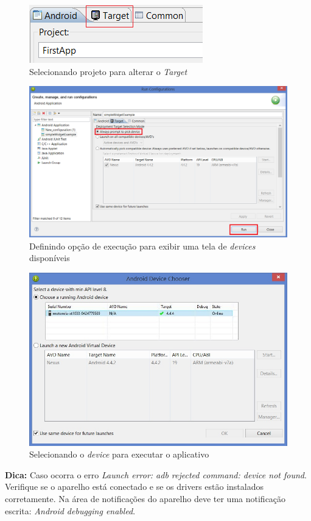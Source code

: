 \documentclass[a4paper,12pt,brazil,oneside]{book}
\begin{document}
\begin{figure}[H]
  \centering
  \includegraphics[width=.4\textwidth]{figuras/emulador/AddEmulador3.png}
  \caption{Selecionando projeto para alterar o \emph{Target}}
  \label{fig:AddEmulador3}
\end{figure}

\begin{figure}[H]
  \centering
  \includegraphics[width=.7\textwidth]{figuras/emulador/AddEmulador12.png}
  \caption{Definindo opção de execução para exibir uma tela de \emph{devices} disponíveis}
  \label{fig:AddEmulador12}
\end{figure}

\begin{figure}[H]
  \centering
  \includegraphics[width=.7\textwidth]{figuras/emulador/AddEmulador13.png}
  \caption{Selecionando o \emph{device} para executar o aplicativo}
  \label{fig:AddEmulador13}
\end{figure}

\begin{framed}
\textbf{Dica:} Caso ocorra o erro \emph{Launch error: adb rejected command: device not found}. Verifique se o aparelho está conectado e se os drivers estão instalados corretamente. Na área de notificações do aparelho deve ter uma notificação escrita: \emph{Android debugging enabled}. 
\end{framed}
\end{document}
